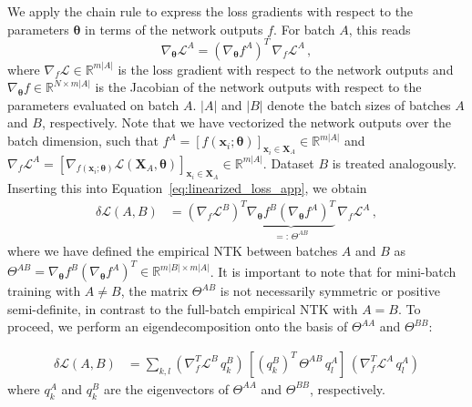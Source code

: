 We apply the chain rule to express the loss gradients with respect to the parameters \(\boldsymbol{\theta}\) in terms of the network outputs \(f\). For batch \(A\), this reads
\begin{equation}
    \nabla_{\boldsymbol{\theta}} \mathcal{L}^A = (\nabla_{\boldsymbol{\theta}} f^A)^T \, \nabla_f \mathcal{L}^A \, ,
\end{equation}
where \(\nabla_f \mathcal{L} \in \mathbb{R}^{m |A|}\) is the loss gradient with respect to the network outputs and \(\nabla_{\boldsymbol{\theta}} f \in \mathbb{R}^{N \times m|A|}\) is the Jacobian of the network outputs with respect to the parameters evaluated on batch \(A\). \(|A|\) and \(|B|\) denote the batch sizes of batches \(A\) and \(B\), respectively. 
Note that we have vectorized the network outputs over the batch dimension, such that \(f^A = [f(\mathbf{x}_i; \boldsymbol{\theta})]_{\mathbf{x}_i \in \mathbf{X}_A} \in \mathbb{R}^{m |A|}\) and \(\nabla_f \mathcal{L}^A = [\nabla_{f(\mathbf{x}_i; \boldsymbol{\theta})} \mathcal{L}(\mathbf{X}_A, \boldsymbol{\theta})]_{\mathbf{x}_i \in \mathbf{X}_A} \in \mathbb{R}^{m |A|}\). Dataset \( B \) is treated analogously.
Inserting this into Equation~\ref{eq:linearized_loss_app}, we obtain
\begin{align}
    \delta \mathcal{L}(A, B)
    &= (\nabla_f \mathcal{L}^B)^T \underbrace{\nabla_{\boldsymbol{\theta}} f^B (\nabla_{\boldsymbol{\theta}} f^A)^T}_{=: \, \Theta^{A B}} \, \nabla_f \mathcal{L}^A \, ,
    \label{eq:loss_evolution_factorized_general_app}
\end{align}
where we have defined the empirical NTK between batches \(A\) and \(B\) as \(\Theta^{A B} = \nabla_{\boldsymbol{\theta}} f^B (\nabla_{\boldsymbol{\theta}} f^A)^T \in \mathbb{R}^{m |B| \times m |A|}\).
It is important to note that for mini-batch training with \(A \neq B\), the matrix \(\Theta^{A B}\) is not necessarily symmetric or positive semi-definite, in contrast to the full-batch empirical NTK with \(A = B\).
To proceed, we perform an eigendecomposition onto the basis of \(\Theta^{AA}\) and \(\Theta^{BB}\):

\begin{align}
    \delta \mathcal{L}(A, B)
    &= \sum_{k, l} (\nabla_f^T \mathcal{L}^B \, q_k^B) \, \left[ (q_k^B)^T \, \Theta^{A B} \, q_l^A \right] \, (\nabla_f^T \mathcal{L}^A \, q_l^A) 
    \label{eq:loss_evolution_factorized_mb_app}
\end{align}
where \(q_k^A\) and \(q_k^B\) are the eigenvectors of \(\Theta^{AA}\) and \(\Theta^{BB}\), respectively.

